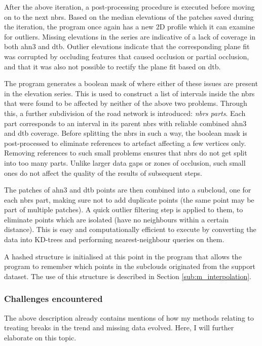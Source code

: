After the above iteration, a post-processing procedure is executed before moving on to the next \ac{nbrs}. Based on the median elevations of the patches saved during the iteration, the program once again has a new 2D profile which it can examine for outliers. Missing elevations in the series are indicative of a lack of coverage in both \ac{ahn3} and \ac{dtb}. Outlier elevations indicate that the corresponding plane fit was corrupted by occluding features that caused occlusion or partial occlusion, and that it was also not possible to rectify the plane fit based on \ac{dtb}.

The program generates a boolean mask of where either of these issues are present in the elevation series. This is used to construct a list of intervals inside the \ac{nbrs} that were found to be affected by neither of the above two problems. Through this, a further subdivision of the road network is introduced: \textit{\ac{nbrs} parts}. Each part corresponds to an interval in its parent \ac{nbrs} with reliable combined \ac{ahn3} and \ac{dtb} coverage. Before splitting the \ac{nbrs} in such a way, the boolean mask is post-processed to eliminate references to artefact affecting a few vertices only. Removing references to such small problems ensures that \ac{nbrs} do not get split into too many parts. Unlike larger data gaps or zones of occlusion, such small ones do not affect the quality of the results of subsequent steps.

The patches of \ac{ahn3} and \ac{dtb} points are then combined into a subcloud, one for each \ac{nbrs} part, making sure not to add duplicate points (the same point may be part of multiple patches). A quick outlier filtering step is applied to them, to eliminate points which are isolated (have no neighbours within a certain distance). This is easy and computationally efficient to execute by converting the data into KD-trees and performing nearest-neighbour queries on them.

A hashed structure is initialised at this point in the program that allows the program to remember which points in the subclouds originated from the support dataset. The use of this structure is described in Section \ref{sub:m_interpolation}.

\subsubsection{Challenges encountered}

The above description already contains mentions of how my methods relating to treating breaks in the trend and missing data evolved. Here, I will further elaborate on this topic.

